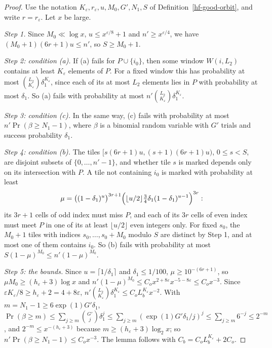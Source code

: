 \begin{proof}
Use the notation $K_\varepsilon,r_\varepsilon,u,M_0,G',N_1,S$ of Definition~\ref{hf-good-orbit}, and
write $r=r_\varepsilon$. Let $x$ be large.

\emph{Step 1.} Since $M_0\ll\log x$, $u\leq x^{\varepsilon/8}+1$ and $n'\geq x^{\varepsilon/4}$, we
have $(M_0+1)(6r+1)u\leq n'$, so $S\geq M_0+1$.

\emph{Step 2: condition (a).} If (a) fails for $P\cup\{i_0\}$, then some window $W(i,L_2)$ contains
at least $K_\varepsilon$ elements of $P$. For a fixed window this has probability at most
$\binom{L_2}{K_\varepsilon}\delta_1^{K_\varepsilon}$, since each of its at most $L_2$ elements lies in
$P$ with probability at most $\delta_1$. So (a) fails with probability at most
$n'\binom{L_2}{K_\varepsilon}\delta_1^{K_\varepsilon}$.

\emph{Step 3: condition (c).} In the same way, (c) fails with probability at most
$n'\Pr(\beta\geq N_1-1)$, where $\beta$ is a binomial random variable with $G'$ trials and success
probability $\delta_1$.

\emph{Step 4: condition (b).} The tiles $[s(6r+1)u,(s+1)(6r+1)u)$, $0\leq s<S$, are disjoint subsets
of $\{0,\ldots,n'-1\}$, and whether tile $s$ is marked depends only on its intersection with $P$. A
tile not containing $i_0$ is marked with probability at least
\[
 \mu=\bigl((1-\delta_1)^u\bigr)^{3r+1}\Bigl(\lfloor u/2\rfloor\tfrac34\delta_1(1-\delta_1)^{u-1}\Bigr)^{3r}:
\]
its $3r+1$ cells of odd index must miss $P$, and each of its $3r$ cells of even index must meet $P$
in one of its at least $\lfloor u/2\rfloor$ even integers only. For fixed $s_0$, the $M_0+1$ tiles
with indices $s_0,\ldots,s_0+M_0$ modulo $S$ are distinct by Step 1, and at most one of them contains
$i_0$. So (b) fails with probability at most $S(1-\mu)^{M_0}\leq n'(1-\mu)^{M_0}$.

\emph{Step 5: the bounds.} Since $u=\lceil1/\delta_1\rceil$ and $\delta_1\leq1/100$,
$\mu\geq10^{-(6r+1)}$, so $\mu M_0\geq(h_\varepsilon+3)\log x$ and
$n'(1-\mu)^{M_0}\leq C_ox^{2+8\varepsilon}x^{-5-8\varepsilon}\leq C_ox^{-3}$. Since
$\varepsilon K_\varepsilon/8\geq h_\varepsilon+2=4+8\varepsilon$,
$n'\binom{L_2}{K_\varepsilon}\delta_1^{K_\varepsilon}\leq C_oL_b^{K_\varepsilon}x^{-2}$. With
$m=N_1-1\geq6\exp(1)G'\delta_1$,
$\Pr(\beta\geq m)\leq\sum_{j\geq m}\binom{G'}{j}\delta_1^j\leq\sum_{j\geq m}(\exp(1)G'\delta_1/j)^j
\leq\sum_{j\geq m}6^{-j}\leq2^{-m}$, and $2^{-m}\leq x^{-(h_\varepsilon+3)}$ because
$m\geq(h_\varepsilon+3)\log_2x$; so $n'\Pr(\beta\geq N_1-1)\leq C_ox^{-3}$. The lemma follows
with $C_b=C_oL_b^{K_\varepsilon}+2C_o$.
\end{proof}

